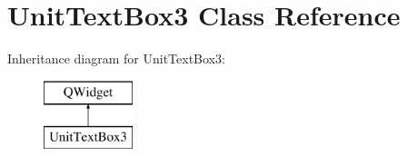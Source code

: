 \hypertarget{class_unit_text_box3}{}\section{Unit\+Text\+Box3 Class Reference}
\label{class_unit_text_box3}
Inheritance diagram for Unit\+Text\+Box3\+:\begin{figure}[H]
\begin{center}
\leavevmode
\includegraphics[height=2.000000cm]{class_unit_text_box3}
\end{center}
\end{figure}
